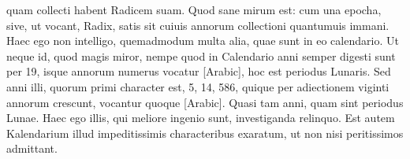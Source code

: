 quam collecti habent Radicem suam.
Quod sane mirum est: cum
una epocha, sive, ut vocant, Radix, satis sit cuiuis annorum collectioni
quantumuis immani.
Haec ego non intelligo, quemadmodum
multa alia, quae sunt in eo calendario.
Ut neque id, quod magis miror,
nempe quod in Calendario anni semper digesti sunt per 19, isque
annorum numerus vocatur \textarabic{}[Arabic], hoc est periodus Lunaris.
Sed anni
illi, quorum primi character est, 5, 14, 586, quique per adiectionem
viginti annorum crescunt, vocantur quoque \textarabic{}[Arabic].
Quasi tam 
anni, quam  sint periodus Lunae.
Haec ego illis, qui meliore ingenio
sunt, investiganda relinquo.
Est autem Kalendarium illud impeditissimis
characteribus exaratum, ut non nisi peritissimos admittant.
%
%
